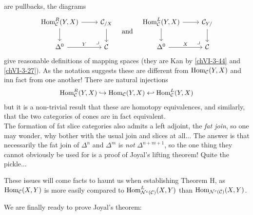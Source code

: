         are pullbacks, the diagrams
        \begin{equation*}
            \begin{tikzcd}
                \Hom_{\Cc}^R(Y, X) \arrow[d] \arrow[r] \arrow[rd, phantom, "\lrcorner", very near end] & \Cc_{/ X} \arrow[d] \\
                \Delta^0 \arrow[r, "Y"] & \Cc
            \end{tikzcd}
            \quad
            \text{and}
            \quad
            \begin{tikzcd}
                \Hom_{\Cc}^L(Y, X) \arrow[d] \arrow[r] \arrow[rd, phantom, "\lrcorner", very near end] & \Cc_{Y /} \arrow[d] \\
                \Delta^0 \arrow[r, "X"] & \Cc
            \end{tikzcd}	
        \end{equation*}
        give reasonable definitions of mapping spaces (they are Kan by \ref{chVI-3-44} and \ref{chVI-3-27}). As the notation suggests these are different from $\operatorname{Hom}_{\mathcal{C}}(Y, X)$ and inn fact from one another! There are natural injections
        \begin{equation*}
            \operatorname{Hom}_{\mathcal{C}}^R(Y, X) \hookrightarrow \operatorname{Hom}_{\mathcal{C}}(Y, X) \hookleftarrow \operatorname{Hom}_{\mathcal{C}}^L(Y, X)
        \end{equation*}
        but it is a non-trivial result that these are homotopy equivalences, and similarly, that the two categories of cones are in fact equivalent.\\
        The formation of fat slice categories also admits a left adjoint, the \emph{fat join}, so one may wonder, why bother with the usual join and slices at all... The answer is that necessarily the fat join of $\Delta^n$ and $\Delta^m$ is \emph{not} $\Delta^{n+m+1}$, so the one thing they cannot obviously be used for is a proof of Joyal's lifting theorem! Quite the pickle...

        These issues will come facts to haunt us when establishing Theorem H, as $\operatorname{Hom}_{\mathcal{C}}(X, Y)$ is more easily compared to $\operatorname{Hom}_{\mathcal{N}^c(\mathcal{C})}^L(X, Y)$ than $\operatorname{Hom}_{\mathcal{N}^c(\mathcal{C})}(X, Y)$.
        \medskip

        We are finally ready to prove Joyal's theorem:

